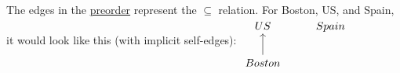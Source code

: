 The edges in the \hyperref[D1.30]{preorder} represent the $\subseteq$ relation. For Boston, US, and Spain, it would look like this (with implicit self-edges): $\begin{tikzcd}US& Spain \\Boston \arrow[u] &\end{tikzcd}$

